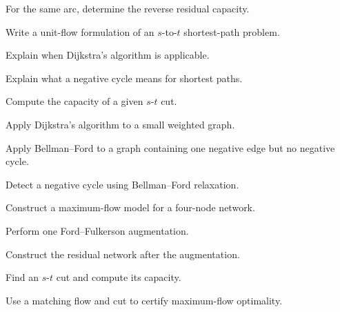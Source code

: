 \begin{exercise}[2]
For the same arc, determine the reverse residual capacity.
\end{exercise}

\begin{exercise}[2]
Write a unit-flow formulation of an \(s\)-to-\(t\) shortest-path problem.
\end{exercise}

\begin{exercise}[2]
Explain when Dijkstra's algorithm is applicable.
\end{exercise}

\begin{exercise}[2]
Explain what a negative cycle means for shortest paths.
\end{exercise}

\begin{exercise}[2]
Compute the capacity of a given \(s\)-\(t\) cut.
\end{exercise}

\begin{exercise}[3]
Apply Dijkstra's algorithm to a small weighted graph.
\end{exercise}

\begin{exercise}[3]
Apply Bellman--Ford to a graph containing one negative edge but no
negative cycle.
\end{exercise}

\begin{exercise}[3]
Detect a negative cycle using Bellman--Ford relaxation.
\end{exercise}

\begin{exercise}[3]
Construct a maximum-flow model for a four-node network.
\end{exercise}

\begin{exercise}[3]
Perform one Ford--Fulkerson augmentation.
\end{exercise}

\begin{exercise}[3]
Construct the residual network after the augmentation.
\end{exercise}

\begin{exercise}[3]
Find an \(s\)-\(t\) cut and compute its capacity.
\end{exercise}

\begin{exercise}[3]
Use a matching flow and cut to certify maximum-flow optimality.
\end{exercise}


